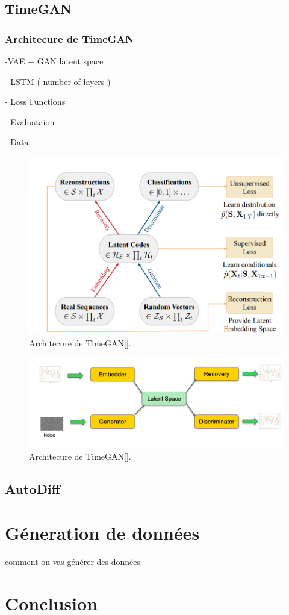 \subsection{TimeGAN}
\subsubsection{Architecure de TimeGAN}

-VAE + GAN latent space

- LSTM ( number of layers )

- Loss Functions

- Evaluataion

- Data

\begin{figure}[hbt!]
  \centering
  \includegraphics[width=12cm]{images_pfe/timegan.png}
  \caption{Architecure de TimeGAN[\cite{yoon2019time}].}
  \label{fig:timegan}
\end{figure}
\FloatBarrier

\begin{figure}[hbt!]
  \centering
  \includegraphics[width=12cm]{images_pfe/timegan_archi.png}
  \caption{Architecure de TimeGAN[\cite{yoon2019time}].}
  \label{fig:timegan}
\end{figure}
\FloatBarrier

\subsection{AutoDiff}

\section{Géneration de données}

comment on vas générer des données

\section{Conclusion}